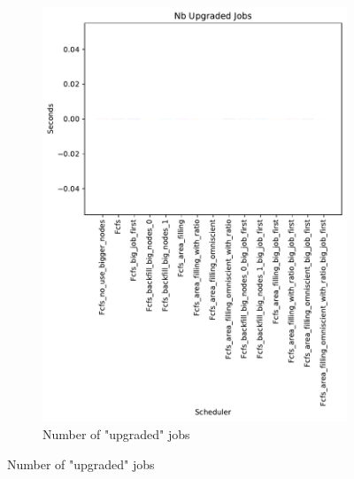 \documentclass[a4paper]{article}
\begin{document}
\begin{figure}[H]\centering
\begin{subfigure}[b]{0.4\linewidth}\centering\includegraphics[width=1\linewidth]{MBSS/plot/Size_Constraint_2022-01-24->2022-01-24_Nb_Upgraded_Jobs_450_128_32_256_4_1024.pdf}\caption{Number of "upgraded" jobs}\label{14}\end{subfigure}

\end{figure}
\end{document}

